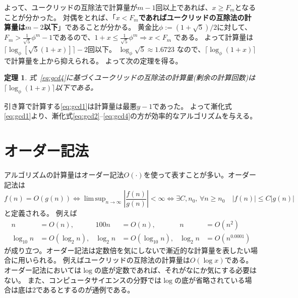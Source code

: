 \documentclass[a4paper,twoside,onecolumn,openany,article,10pt]{memoir}
\newtheorem{theorem}{定理}
\theoremstyle{remark}
\begin{document}
よって、ユークリッドの互除法で計算量が$m-1$回以上であれば、$x\ge F_{m}$となることが分かった。
対偶をとれば、「\textbf{$x <F_{m}$であればユークリッドの互除法の計算量は$m-2$以下}」であることが分かる。
黄金比$\phi:=(1+\sqrt{5})/2$に対して、$F_m> \frac1{\sqrt{5}}\phi^m-1$であるので、$1+x \le \frac1{\sqrt{5}}\phi^{m} \Rightarrow x< F_{m}$ である。
よって計算量は $\lceil\log_\phi[\sqrt{5}(1+x)]\rceil-2$回以下。
$\log_\phi \sqrt{5} \approx 1.6723$ なので、$\lceil\log_\phi (1+x)\rceil$ で計算量を上から抑えられる。
よって次の定理を得る。
\begin{theorem}
式~\eqref{eq:gcd4}に基づくユークリッドの互除法の計算量(剰余の計算回数)は$\lceil\log_\phi(1+x)\rceil$以下である。
\end{theorem}
引き算で計算する\eqref{eq:gcd1}は計算量は最悪$y-1$であった。
よって漸化式\eqref{eq:gcd1}より、漸化式\eqref{eq:gcd2}--\eqref{eq:gcd4}の方が効率的なアルゴリズムを与える。


\section{オーダー記法}
アルゴリズムの計算量はオーダー記法$O(\cdot)$を使って表すことが多い。オーダー記法は
\begin{equation*}
f(n)=O(g(n)) \iff \mathop{\mathrm{lim\,sup}}_{n\to\infty} \left|\frac{f(n)}{g(n)}\right| < \infty
\iff \exists C, n_0,\, \forall n\ge n_0\quad |f(n)|\le C|g(n)|
\end{equation*}
と定義される。
例えば
\begin{align*}
n &= O(n),&
100n &= O(n),&
n &= O(n^2)\\
\log_{10} n &= O(\log_{2} n),&
\log_{2} n &= O(\log_{10} n),&
\log_2 n &= O(n^{0.0001})
\end{align*}
が成り立つ。オーダー記法は定数倍を気にしないで漸近的な計算量を表したい場合に用いられる。
例えばユークリッドの互除法の計算量は$O(\log x)$である。オーダー記法においては$\log$の底が定数であれば、それがなにか気にする必要はない。
また、コンピュータサイエンスの分野では$\log$の底が省略されている場合は底は2であるとするのが通例である。
\end{document}
